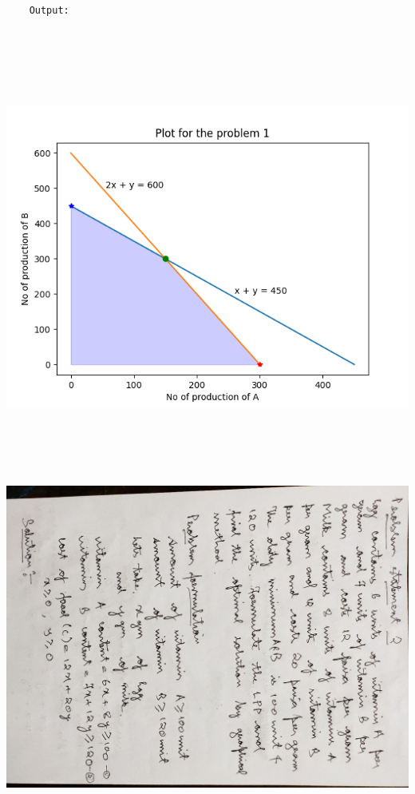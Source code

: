 \documentclass[12pt, letterpaper, twoside]{book}
\begin{document}
\begin{lstlisting}

	Output:
	
\end{lstlisting}
\begin{center}
\includegraphics[height=400pt]{Plot1}
\end{center}
\includegraphics[width=\paperheight, height=\paperwidth, angle=90]{Page6}
\end{document}
